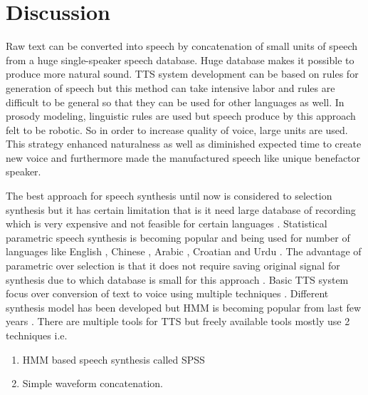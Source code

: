 \section{Discussion}
Raw text can be converted into speech by concatenation of small units of speech from a huge single-speaker speech database. Huge database makes it possible to produce more natural sound. TTS system development can be based on rules for generation of speech but this method can take intensive labor and rules are difficult to be general so that they can be used for other languages as well. In prosody modeling, linguistic rules are used \cite{klatt1987review, pierrehumbert1981synthesizing} but speech produce by this approach felt to be robotic. So in order to increase quality of voice, large units are used. This strategy enhanced naturalness as well as diminished expected time to create new voice and furthermore made the manufactured speech like unique benefactor speaker.

The best approach for speech synthesis until now is considered to selection synthesis but it has certain limitation that is it need large database of recording which is very expensive and not feasible for certain languages \cite{black1994chatr, hunt1996unit, black2003unit}. Statistical parametric speech synthesis is becoming popular and being used for number of languages like English \cite{tokuda2002hmm}, Chinese \cite{qian2006hmm}, Arabic \cite{abdel2006improving}, Croatian \cite{martincic2006croatian} and Urdu \cite{ahmed2014hmm}. The advantage of parametric over selection is that it does not require saving original signal for synthesis due to which database is small for this approach \cite{zen2009statistical}. Basic TTS system focus over conversion of text to voice using multiple techniques \cite{merritt2013investigating}. Different synthesis model has been developed but HMM is becoming popular from last few years \cite{ze2013statistical}. There are multiple tools for TTS but freely available tools mostly use 2 techniques i.e.

\begin{enumerate}
	\item HMM based speech synthesis called SPSS
	\item Simple waveform concatenation.
\end{enumerate}

